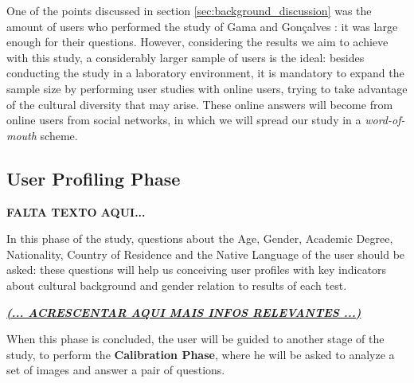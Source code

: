 One of the points discussed in section \ref{sec:background_discussion} was the amount of users who performed the study of Gama and Gonçalves
\cite{Gama20141,Gama20142}: it was large enough for their questions. However, considering the results we aim to achieve with this study, a considerably larger sample of users is the ideal: besides conducting
the study in a laboratory environment, it is mandatory to expand the sample size by performing user studies with online users, trying to take advantage of
the cultural diversity that may arise. These online answers will become from online users from social networks, in which we will spread our study in a \emph{word-of-mouth} scheme. \par




%
\subsection{User Profiling Phase}
\label{subsec:design_profiling}
%
\textbf{FALTA TEXTO AQUI...} \par
%
In this phase of the study, questions about the Age, Gender, Academic Degree, Nationality, Country of Residence and the Native Language of the user should be asked: these questions will help us conceiving user profiles with key indicators about cultural background and gender relation to results of each test. \par
%
\textbf{\underline{\emph{(... ACRESCENTAR AQUI MAIS INFOS RELEVANTES ...)}}} \par
%
When this phase is concluded, the user will be guided to another stage of the study, to perform the \textbf{Calibration Phase}, where he will be asked to analyze a set of images and answer a pair of questions. \par
%
